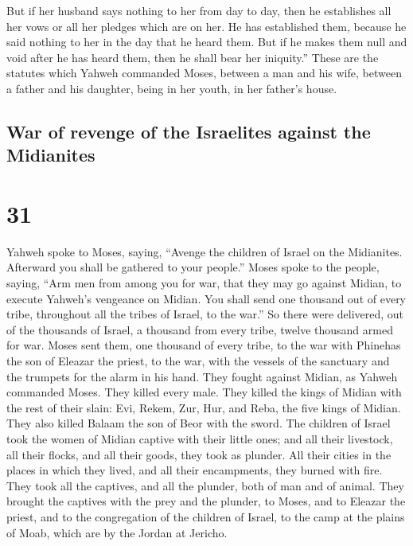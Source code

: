  But if her husband says nothing to her from day to day,
then he establishes all her vows or all her pledges which are on her. He
has established them, because he said nothing to her in the day that he
heard them.  But if he makes them null and void after he
has heard them, then he shall bear her iniquity.''  These
are the statutes which Yahweh commanded Moses, between a man and his
wife, between a father and his daughter, being in her youth, in her
father's house.

\hypertarget{war-of-revenge-of-the-israelites-against-the-midianites}{%
\subsection{War of revenge of the Israelites against the
Midianites}\label{war-of-revenge-of-the-israelites-against-the-midianites}}

\hypertarget{section-30}{%
\section{31}\label{section-30}}

 Yahweh spoke to Moses, saying,  ``Avenge
the children of Israel on the Midianites. Afterward you shall be
gathered to your people.''  Moses spoke to the people,
saying, ``Arm men from among you for war, that they may go against
Midian, to execute Yahweh's vengeance on Midian.  You
shall send one thousand out of every tribe, throughout all the tribes of
Israel, to the war.''  So there were delivered, out of the
thousands of Israel, a thousand from every tribe, twelve thousand armed
for war.  Moses sent them, one thousand of every tribe, to
the war with Phinehas the son of Eleazar the priest, to the war, with
the vessels of the sanctuary and the trumpets for the alarm in his hand.
 They fought against Midian, as Yahweh commanded Moses.
They killed every male.  They killed the kings of Midian
with the rest of their slain: Evi, Rekem, Zur, Hur, and Reba, the five
kings of Midian. They also killed Balaam the son of Beor with the sword.
 The children of Israel took the women of Midian captive
with their little ones; and all their livestock, all their flocks, and
all their goods, they took as plunder.  All their cities
in the places in which they lived, and all their encampments, they
burned with fire.  They took all the captives, and all
the plunder, both of man and of animal.  They brought the
captives with the prey and the plunder, to Moses, and to Eleazar the
priest, and to the congregation of the children of Israel, to the camp
at the plains of Moab, which are by the Jordan at Jericho.

